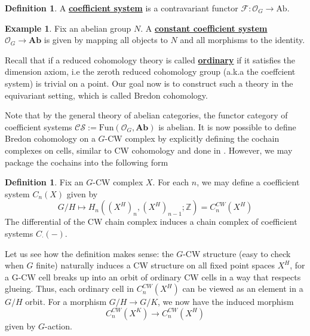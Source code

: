 \documentclass{article}
\theoremstyle{definition}
\newtheorem{definition}[theorem]{Definition}
\newtheorem{example}[theorem]{Example}
\begin{document}
\begin{tcolorbox}[colback=purple!5!white,colframe=purple!75!black]
\begin{definition}
A \underline{\textbf{coefficient system}} is a contravariant functor $\mathcal{F}: \mathcal{O}_G\to \textrm{Ab}$.
\end{definition}
\end{tcolorbox}


\begin{tcolorbox}[colback=yellow!5!white,colframe=yellow!30!white]
\begin{example}
\label{ccs}
Fix an abelian group $N$. A \underline{\textbf{constant coefficient system}} $\mathcal{O}_G\to \textbf{Ab}$ is given by mapping all objects to $N$ and all morphisms to the identity. 
\end{example}
\end{tcolorbox}



Recall that if a reduced cohomology theory is called \underline{\textbf{ordinary}} if it satisfies the dimension axiom, i.e the zeroth reduced cohomology group (a.k.a the coeffcient system) is trivial on a point. Our goal now is to construct such a theory in the equivariant setting, which is called Bredon cohomology. 

Note that by the general theory of abelian categories, the functor category of coefficient systems $\mathcal{CS}:=\textrm{Fun}(\mathcal{O}_G, \textbf{Ab})$ is abelian. It is now possible to define Bredon cohomology on a $G$-CW complex by explicitly defining the cochain complexes on cells, similar to CW cohomology and done in \cite{Bredon}. However, we may package the cochains into the following form 

\begin{tcolorbox}[colback=purple!5!white,colframe=purple!75!black]
\begin{definition}
Fix an $G$-CW complex $X$. For each $n$, we may define a coefficient system $C_n(X)$ given by 
\[G/H\mapsto H_n((X^H)_{n},(X^H)_{n-1}; \mathbb{Z})=C_n^{CW}(X^H)\]
The differential of the CW chain complex induces a chain complex of coefficient systems $C_{\cdot}(-)$. 
\end{definition}
\end{tcolorbox}
Let us see how the definition makes sense: the $G$-CW structure (easy to check when $G$ finite) naturally induces a CW structure on all fixed point spaces $X^H$, for a G-CW cell breaks up into an orbit of ordinary CW cells in a way that respects glueing. Thus, each ordinary cell in $C^{CW}_n(X^H)$ can be viewed as an element in a $G/H$ orbit. For a morphism $G/H\to G/K$, we now have the induced morphism 
\[C_n^{CW}(X^K)\to C_n^{CW}(X^H)\]
given by $G$-action.
\end{document}
